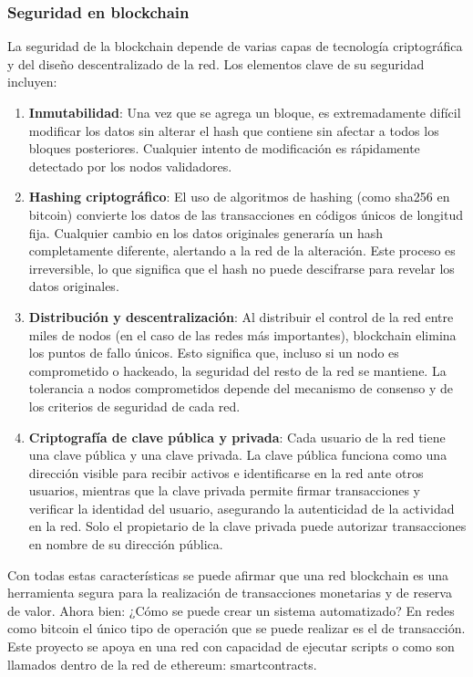 \subsubsection{Seguridad en blockchain }
La seguridad de la blockchain depende de varias capas de tecnología criptográfica y del diseño 
descentralizado de la red. 
Los elementos clave de su seguridad incluyen:
    \begin{enumerate}
        \item \textbf{Inmutabilidad}: Una vez que se agrega un bloque, es extremadamente difícil 
        modificar los datos sin alterar el \gls{hash} que contiene sin afectar a todos los bloques 
        posteriores. 
        Cualquier intento de modificación es rápidamente detectado por los nodos validadores.
        \item \textbf{Hashing criptográfico}: El uso de algoritmos de \gls{hashing} 
        (como \gls{sha256} en \gls{bitcoin}) convierte los datos de las transacciones en 
        códigos únicos de longitud fija. Cualquier cambio en los datos originales generaría 
        un \gls{hash} completamente diferente, alertando a la red de la alteración. 
        Este proceso es irreversible, lo que significa que el \gls{hash} no puede descifrarse 
        para revelar los datos originales.
        \item \textbf{Distribución y descentralización}: Al distribuir el control de la red entre 
        miles de nodos (en el caso de las redes más importantes), \gls{blockchain} elimina los 
        puntos de fallo únicos. Esto significa que, incluso si un nodo es comprometido o hackeado, 
        la seguridad del resto de la red se mantiene. La tolerancia a nodos comprometidos depende del mecanismo de consenso y de los criterios de seguridad de cada red.
\item \textbf{Criptografía de clave pública y privada}: Cada usuario de la red tiene una
        clave pública y una clave privada. La clave pública funciona como una dirección visible 
        para recibir activos e identificarse en la red ante otros usuarios, mientras que la clave 
        privada permite firmar transacciones y verificar la identidad del usuario, 
        asegurando la autenticidad de la actividad en la red. 
        Solo el propietario de la clave privada puede autorizar transacciones en nombre de 
        su dirección pública.
       
    \end{enumerate}

Con todas estas características se puede afirmar que una red \gls{blockchain} es una herramienta 
segura para la realización de transacciones monetarias y de reserva de valor. 
Ahora bien: ¿Cómo se puede crear un sistema automatizado?
En redes como \gls{bitcoin} el único tipo de operación que se puede realizar es el de transacción. 
Este proyecto se apoya en una red con capacidad de ejecutar \glspl{script} o como son 
llamados dentro de la red de \gls{ethereum}: \glspl{smartcontract}.


